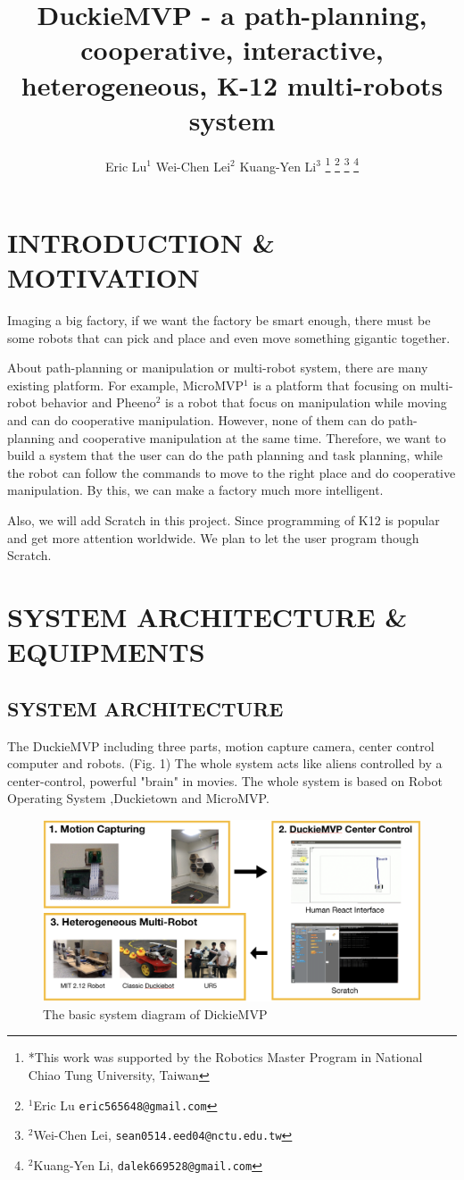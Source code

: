\documentclass[letterpaper, 10 pt, conference]{ieeeconf}  %
\title{\LARGE \bf
DuckieMVP - a path-planning, cooperative, interactive, heterogeneous, K-12 multi-robots system
}
\author{Eric Lu$^{1}$ Wei-Chen Lei$^{2}$ Kuang-Yen Li$^{3}$%
\thanks{*This work was supported by the Robotics Master Program in National Chiao Tung University, Taiwan}%
\thanks{$^{1}$Eric Lu
        {\tt\small eric565648@gmail.com}}%
\thanks{$^{2}$Wei-Chen Lei,
        {\tt\small sean0514.eed04@nctu.edu.tw}}%
\thanks{$^{2}$Kuang-Yen Li,
        {\tt\small dalek669528@gmail.com}}%
}
\begin{document}
\maketitle
\thispagestyle{empty}
\pagestyle{empty}


\section{INTRODUCTION \& MOTIVATION}

Imaging a big factory, if we want the factory be smart enough, there must be some robots that can pick and place and even move something gigantic together.

About path-planning or manipulation or multi-robot system, there are many existing platform. For example, MicroMVP$^{1}$ is a platform that focusing on multi-robot behavior and Pheeno$^{2}$ is a robot that focus on manipulation while moving and can do cooperative manipulation. However, none of them can do path-planning and cooperative manipulation at the same time. Therefore, we want to build a system that the user can do the path planning and task planning, while the robot can follow the commands to move to the right place and do cooperative manipulation. By this, we can make a factory much more intelligent.

Also, we will add Scratch in this project. Since programming of K12 is popular and get more attention worldwide. We plan to let the user program though Scratch.

\section{SYSTEM ARCHITECTURE \& EQUIPMENTS}

\subsection{SYSTEM ARCHITECTURE}
The DuckieMVP including three parts, motion capture camera, center control computer and robots. (Fig. 1) The whole system acts like aliens controlled by a center-control, powerful "brain" in movies. The whole system is based on Robot Operating System ,Duckietown and MicroMVP.
\begin{figure}[h] %
\includegraphics[width=1\columnwidth]{system_diagram1}
\centering
\caption{The basic system diagram of DickieMVP}
 \label{figure:system_diagram1}
\end{figure}
\end{document}
